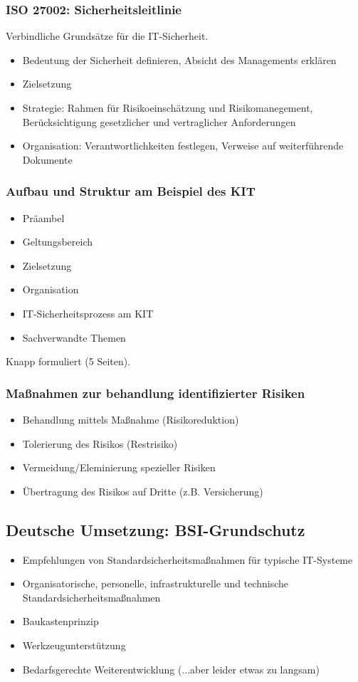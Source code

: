 \subsubsection{ISO 27002: Sicherheitsleitlinie}
Verbindliche Grundsätze für die IT-Sicherheit.
\begin{itemize}
	\item Bedeutung der Sicherheit definieren, Absicht des Managements erklären
	\item Zielsetzung
	\item Strategie: Rahmen für Risikoeinschätzung und Risikomanegement, Berücksichtigung gesetzlicher und vertraglicher Anforderungen
	\item Organisation: Verantwortlichkeiten festlegen, Verweise auf weiterführende Dokumente
\end{itemize}

\subsubsection{Aufbau und Struktur am Beispiel des KIT}
\begin{itemize}
	\item Präambel
	\item Geltungsbereich
	\item Zielsetzung
	\item Organisation
	\item IT-Sicherheitsprozess am KIT
	\item Sachverwandte Themen
\end{itemize}
Knapp formuliert (5 Seiten).

\subsubsection{Maßnahmen zur behandlung identifizierter Risiken}
\begin{itemize}
	\item Behandlung mittels Maßnahme (Risikoreduktion)
	\item Tolerierung des Risikos (Restrisiko)
	\item Vermeidung/Eleminierung spezieller Risiken
	\item Übertragung des Risikos auf Dritte (z.B. Versicherung)
\end{itemize}


\subsection{Deutsche Umsetzung: BSI-Grundschutz}
\begin{itemize}
	\item Empfehlungen von Standardsicherheitsmaßnahmen für typische IT-Systeme
	\item Organisatorische, personelle, infrastrukturelle und technische Standardsicherheitsmaßnahmen
	\item Baukastenprinzip
	\item Werkzeugunterstützung
	\item Bedarfsgerechte Weiterentwicklung (...aber leider etwas zu langsam)
\end{itemize}

